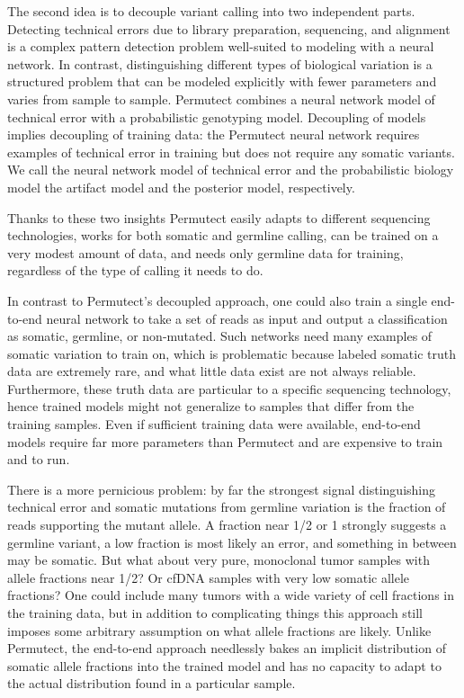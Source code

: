 \documentclass[times, twoside, watermark]{StyleBioRxiv}
\begin{document}
The second idea is to decouple variant calling into two independent parts.  Detecting technical errors due to library preparation, sequencing, and alignment is a complex pattern detection problem well-suited to modeling with a neural network.  In contrast, distinguishing different types of biological variation is a structured problem that can be modeled explicitly with fewer parameters and varies from sample to sample.  Permutect combines a neural network model of technical error with a probabilistic genotyping model.  Decoupling of models implies decoupling of training data: the Permutect neural network requires examples of technical error in training but does not require any somatic variants.  We call the neural network model of technical error and the probabilistic biology model the artifact model and the posterior model, respectively.

Thanks to these two insights Permutect easily adapts to different sequencing technologies, works for both somatic and germline calling, can be trained on a very modest amount of data, and needs only germline data for training, regardless of the type of calling it needs to do.

In contrast to Permutect's decoupled approach, one could also train a single end-to-end neural network to take a set of reads as input and output a classification as somatic, germline, or non-mutated.  Such networks need many examples of somatic variation to train on, which is problematic because labeled somatic truth data are extremely rare, and what little data exist are not always reliable.  Furthermore, these truth data are particular to a specific sequencing technology, hence trained models might not generalize to samples that differ from the training samples.  Even if sufficient training data were available, end-to-end models require far more parameters than Permutect and are expensive to train and to run.

There is a more pernicious problem: by far the strongest signal distinguishing technical error and somatic mutations from germline variation is the fraction of reads supporting the mutant allele.  A fraction near 1/2 or 1 strongly suggests a germline variant, a low fraction is most likely an error, and something in between may be somatic.  But what about very pure, monoclonal tumor samples with allele fractions near 1/2?  Or cfDNA samples with very low somatic allele fractions?  One could include many tumors with a wide variety of cell fractions in the training data, but in addition to complicating things this approach still imposes some arbitrary assumption on what allele fractions are likely.  Unlike Permutect, the end-to-end approach needlessly bakes an implicit distribution of somatic allele fractions into the trained model and has no capacity to adapt to the actual distribution found in a particular sample.
\end{document}
